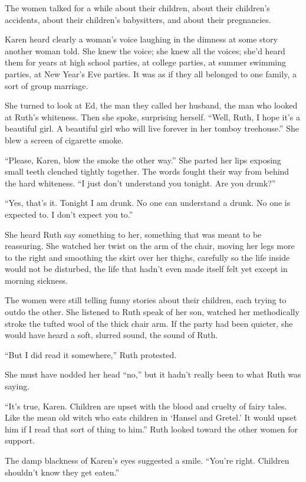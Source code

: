 \documentclass[twoside,10pt]{book}
\begin{document}
The women talked for a while about their children, about their
children's accidents, about their children's babysitters, and about
their pregnancies.

Karen heard clearly a woman's voice laughing in the dimness at some
story another woman told. She knew the voice; she knew all the voices;
she'd heard them for years at high school parties, at college parties,
at summer swimming parties, at New Year's Eve parties. It was as if they
all belonged to one family, a sort of group marriage.

She turned to look at Ed, the man they called her husband, the man who
looked at Ruth's whiteness. Then she spoke, surprising herself. ``Well,
Ruth, I hope it's a beautiful girl. A beautiful girl who will live
forever in her tomboy treehouse.'' She blew a screen of cigarette smoke.

``Please, Karen, blow the smoke the other way.'' She parted her lips
exposing small teeth clenched tightly together. The words fought their
way from behind the hard whiteness. ``I just don't understand you
tonight. Are you drunk?''

``Yes, that's it. Tonight I am drunk. No one can understand a drunk. No
one is expected to. I don't expect you to.''

She heard Ruth say something to her, something that was meant to be
reassuring. She watched her twist on the arm of the chair, moving her
legs more to the right and smoothing the skirt over her thighs,
carefully so the life inside would not be disturbed, the life that
hadn't even made itself felt yet except in morning sickness.

The women were still telling funny stories about their children, each
trying to outdo the other. She listened to Ruth speak of her son,
watched her methodically stroke the tufted wool of the thick chair arm.
If the party had been quieter, she would have heard a soft, slurred
sound, the sound of Ruth.

``But I did read it somewhere,'' Ruth protested.

She must have nodded her head ``no,'' but it hadn't really been to what
Ruth was saying.

``It's true, Karen. Children are upset with the blood and cruelty of
fairy tales. Like the mean old witch who eats children in `Hansel and
Gretel.' It would upset him if I read that sort of thing to him.'' Ruth
looked toward the other women for support.

The damp blackness of Karen's eyes suggested a smile. ``You're right.
Children shouldn't know they get eaten.''
\end{document}
